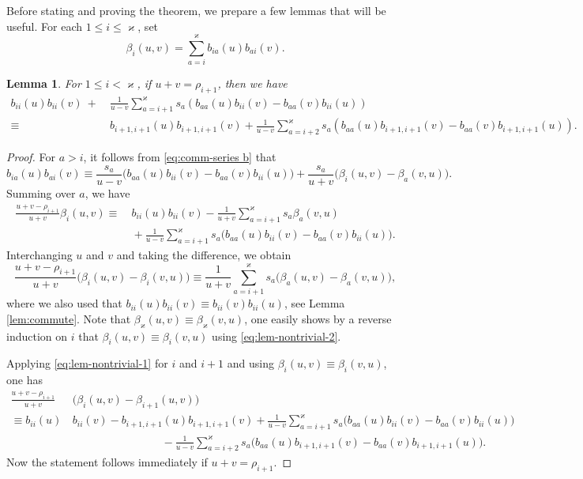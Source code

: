 \documentclass[11pt,reqno]{amsart}
\numberwithin{equation}{section}
\newtheorem{lem}[thm]{Lemma}
\theoremstyle{definition}
\theoremstyle{remark}
\newcommand{\beq}{\begin{equation}}
\newcommand{\eeq}{\end{equation}}
\newcommand{\lle}{\leqslant}
\newcommand{\ka}{\varkappa}
\begin{document}
Before stating and proving the theorem, we prepare a few lemmas that will be useful. For each $1\lle i\lle \ka$, set
\beq\label{eq:beta}
\beta_i(u,v)=\sum_{a=i}^\ka b_{ia}(u)b_{ai}(v).
\eeq
\begin{lem}
For $1\lle i<\ka$, if $u+v=\rho_{i+1}$, then we have
\begin{align*}
b_{ii}(u)b_{ii}(v)\ +&\ \frac{1}{u-v}\sum_{a=i+1}^\ka s_a(b_{aa}(u)b_{ii}(v)-b_{aa}(v)b_{ii}(u))\\
\equiv &\
b_{i+1,i+1}(u)b_{i+1,i+1}(v)+\frac{1}{u-v}\sum_{a=i+2}^\ka s_a(b_{aa}(u)b_{i+1,i+1}(v)-b_{aa}(v)b_{i+1,i+1}(u)).
\end{align*}
\end{lem}
\begin{proof}
For $a>i$, it follows from \eqref{eq:comm-series b} that
\[
b_{ia}(u)b_{ai}(v)\equiv \frac{s_a}{u-v}\big(b_{aa}(u)b_{ii}(v)-b_{aa}(v)b_{ii}(u)\big)+\frac{s_a}{u+v}\big(\beta_i(u,v)-\beta_a(v,u)\big).
\]
Summing over $a$, we have
\beq\label{eq:lem-nontrivial-1}
\begin{split}
    \frac{u+v-\rho_{i+1}}{u+v}\beta_i(u,v)\equiv &\ b_{ii}(u)b_{ii}(v)-\frac{1}{u+v}\sum_{a=i+1}^\ka s_a\beta_a(v,u)\\
    & \ +\frac{1}{u-v}\sum_{a=i+1}^\ka s_a\big(b_{aa}(u)b_{ii}(v)-b_{aa}(v)b_{ii}(u)\big).
\end{split}
\eeq
Interchanging $u$ and $v$ and taking the difference, we obtain
\beq\label{eq:lem-nontrivial-2}
\frac{u+v-\rho_{i+1}}{u+v}\big(\beta_i(u,v)-\beta_i(v,u)\big)\equiv \frac{1}{u+v}\sum_{a=i+1}^\ka s_a\big(\beta_a(u,v)-\beta_a(v,u)\big),
\eeq
where we also used that $b_{ii}(u)b_{ii}(v)\equiv b_{ii}(v)b_{ii}(u)$, see Lemma \ref{lem:commute}. Note that $\beta_\ka(u,v)\equiv \beta_\ka(v,u)$, one easily shows by a reverse induction on $i$ that $\beta_i(u,v)\equiv \beta_i(v,u)$ using \eqref{eq:lem-nontrivial-2}.

Applying \eqref{eq:lem-nontrivial-1} for $i$ and $i+1$ and using $\beta_i(u,v)\equiv \beta_i(v,u)$, one has
\beq\label{eq:lem-nontrivial-3}
\begin{split}
    \frac{u+v-\rho_{i+1}}{u+v}&\, \big(\beta_i(u,v)-\beta_{i+1}(u,v)\big)\\
    \equiv   b_{ii}(u)&\, b_{ii}(v) -b_{i+1,i+1}(u)b_{i+1,i+1}(v)+\frac{1}{u-v}\sum_{a=i+1}^\ka s_a\big(b_{aa}(u)b_{ii}(v)-b_{aa}(v)b_{ii}(u)\big)\\
    &\ \qquad\qquad \qquad \qquad  -\frac{1}{u-v}\sum_{a=i+2}^\ka s_a\big(b_{aa}(u)b_{i+1,i+1}(v)-b_{aa}(v)b_{i+1,i+1}(u)\big).
\end{split}
\eeq
Now the statement follows immediately if $u+v=\rho_{i+1}$.
\end{proof}
\end{document}
